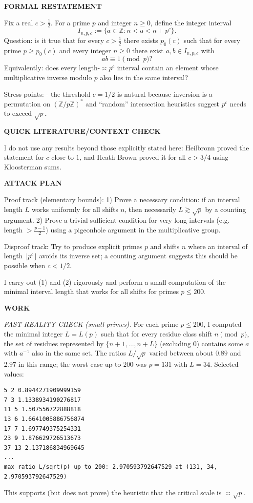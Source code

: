 \medskip
\noindent\textbf{FORMAL RESTATEMENT}

Fix a real $c>\tfrac12$. For a prime $p$ and integer $n\ge 0$, define the integer interval
\[
I_{n,p,c}:=\{a\in\mathbb Z: n<a<n+p^c\}.
\]
Question: is it true that for every $c>\tfrac12$ there exists $p_0(c)$ such that for every prime $p\ge p_0(c)$ and every integer $n\ge 0$ there exist $a,b\in I_{n,p,c}$ with
\[
ab\equiv 1\pmod p?
\]
Equivalently: does every length-$\asymp p^c$ interval contain an element whose multiplicative inverse modulo $p$ also lies in the same interval?

Stress points:
- the threshold $c=1/2$ is natural because inversion is a permutation on $(\mathbb Z/p\mathbb Z)^*$ and ``random'' intersection heuristics suggest $p^c$ needs to exceed $\sqrt p$.

\medskip
\noindent\textbf{QUICK LITERATURE/CONTEXT CHECK}

I do not use any results beyond those explicitly stated here: Heilbronn proved the statement for $c$ close to $1$, and Heath-Brown proved it for all $c>3/4$ using Kloosterman sums.

\medskip
\noindent\textbf{ATTACK PLAN}

Proof track (elementary bounds):
1) Prove a necessary condition: if an interval length $L$ works uniformly for all shifts $n$, then necessarily $L\gtrsim \sqrt p$ by a counting argument.
2) Prove a trivial sufficient condition for very long intervals (e.g. length $>\tfrac{p-1}{2}$) using a pigeonhole argument in the multiplicative group.

Disproof track:
Try to produce explicit primes $p$ and shifts $n$ where an interval of length $\lfloor p^c\rfloor$ avoids its inverse set; a counting argument suggests this should be possible when $c<1/2$.

I carry out (1) and (2) rigorously and perform a small computation of the minimal interval length that works for all shifts for primes $p\le 200$.

\medskip
\noindent\textbf{WORK}

\noindent\emph{FAST REALITY CHECK (small primes).}
For each prime $p\le 200$, I computed the minimal integer $L=L(p)$ such that for every residue class shift $n\pmod p$, the set of residues represented by $\{n+1,\dots,n+L\}$ (excluding $0$) contains some $a$ with $a^{-1}$ also in the same set. The ratios $L/\sqrt p$ varied between about $0.89$ and $2.97$ in this range; the worst case up to $200$ was $p=131$ with $L=34$.
Selected values:
\begin{verbatim}
5 2 0.8944271909999159
7 3 1.1338934190276817
11 5 1.507556722888818
13 6 1.6641005886756874
17 7 1.697749375254331
23 9 1.876629726513673
37 13 2.137186834969645
...
max ratio L/sqrt(p) up to 200: 2.970593792647529 at (131, 34, 2.970593792647529)
\end{verbatim}
This supports (but does not prove) the heuristic that the critical scale is $\asymp \sqrt p$.

